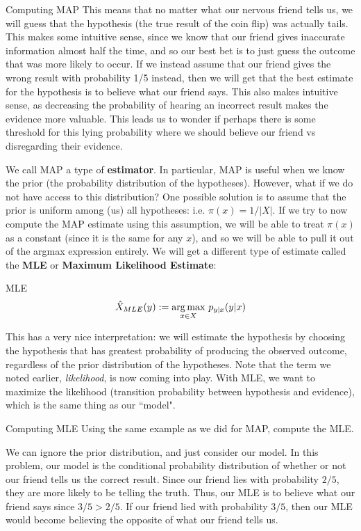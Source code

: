 \begin{exmp}{Computing MAP}{}
This means that no matter what our nervous friend tells us, we will guess that the hypothesis (the true result of the coin flip) was actually tails. This makes some intuitive sense, since we know that our friend gives inaccurate information almost half the time, and so our best bet is to just guess the outcome that was more likely to occur. If we instead assume that our friend gives the wrong result with probability 1/5 instead, then we will get that the best estimate for the hypothesis is to believe what our friend says. This also makes intuitive sense, as decreasing the probability of hearing an incorrect result makes the evidence more valuable. This leads us to wonder if perhaps there is some threshold for this lying probability where we should believe our friend vs disregarding their evidence.


\end{exmp}


We call MAP a type of \textbf{estimator}. In particular, MAP is useful when we know the prior (the probability distribution of the hypotheses). However, what if we do not have access to this distribution? One possible solution is to assume that the prior is uniform among (us) all hypotheses: i.e. \(\pi(x) = 1/|X|\). If we try to now compute the MAP estimate using this assumption, we will be able to treat \(\pi(x)\) as a constant (since it is the same for any \(x\)), and so we will be able to pull it out of the argmax expression entirely. We will get a different type of estimate called the \textbf{MLE} or \textbf{Maximum Likelihood Estimate}:
\begin{defn}{MLE}{}
\begin{equation*}
  {\hat{X}_{MLE}} (y) := \underset{x \in X}{\operatorname*{arg\,max}}\ p_{y|x}(y|x)
\end{equation*}
\end{defn}

This has a very nice interpretation: we will estimate the hypothesis by choosing the hypothesis that has greatest probability of producing the observed outcome, regardless of the prior distribution of the hypotheses. Note that the term we noted earlier, \textit{likelihood}, is now coming into play. With MLE, we want to maximize the likelihood (transition probability between hypothesis and evidence), which is the same thing as our ``model".

\begin{exmp}{Computing MLE}{}
Using the same example as we did for MAP, compute the MLE. \newline 

We can ignore the prior distribution, and just consider our model. In this problem, our model is the conditional probability distribution of whether or not our friend tells us the correct result. Since our friend lies with probability \(2/5\), they are more likely to be telling the truth. Thus, our MLE is to believe what our friend says since \(3/5 > 2/5\). If our friend lied with probability \(3/5\), then our MLE would become believing the opposite of what our friend tells us.
\end{exmp}

